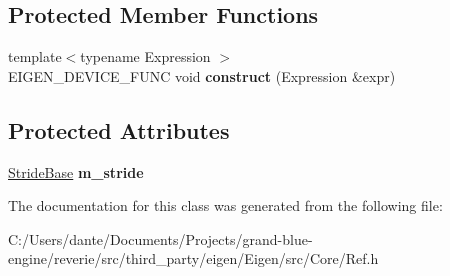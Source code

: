 \subsection*{Protected Member Functions}
\begin{DoxyCompactItemize}
\item 
\mbox{\label{class_eigen_1_1_ref_base_aa099f09a8242561fe6d34b55b74e5dcc}} 
{\footnotesize template$<$typename Expression $>$ }\\E\+I\+G\+E\+N\+\_\+\+D\+E\+V\+I\+C\+E\+\_\+\+F\+U\+NC void {\bfseries construct} (Expression \&expr)
\end{DoxyCompactItemize}
\subsection*{Protected Attributes}
\begin{DoxyCompactItemize}
\item 
\mbox{\label{class_eigen_1_1_ref_base_ae640dbacf501f1dc2ba9f5ba3c9f2598}} 
\mbox{\hyperlink{class_eigen_1_1_stride}{Stride\+Base}} {\bfseries m\+\_\+stride}
\end{DoxyCompactItemize}


The documentation for this class was generated from the following file\+:\begin{DoxyCompactItemize}
\item 
C\+:/\+Users/dante/\+Documents/\+Projects/grand-\/blue-\/engine/reverie/src/third\+\_\+party/eigen/\+Eigen/src/\+Core/Ref.\+h\end{DoxyCompactItemize}
